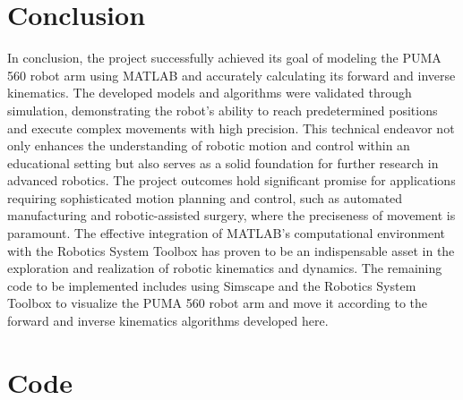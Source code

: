 \documentclass[conference]{IEEEtran}
\begin{document}
\section{Conclusion}
In conclusion, the project successfully achieved its goal of modeling the PUMA 560 robot arm using MATLAB and accurately calculating its forward and inverse kinematics. The developed models and algorithms were validated through simulation, demonstrating the robot's ability to reach predetermined positions and execute complex movements with high precision. This technical endeavor not only enhances the understanding of robotic motion and control within an educational setting but also serves as a solid foundation for further research in advanced robotics. The project outcomes hold significant promise for applications requiring sophisticated motion planning and control, such as automated manufacturing and robotic-assisted surgery, where the preciseness of movement is paramount. The effective integration of MATLAB's computational environment with the Robotics System Toolbox has proven to be an indispensable asset in the exploration and realization of robotic kinematics and dynamics. The remaining code to be implemented includes using Simscape and the Robotics System Toolbox to visualize the PUMA 560 robot arm and move it according to the forward and inverse kinematics algorithms developed here.


\appendices
\section{Code}
\end{document}
